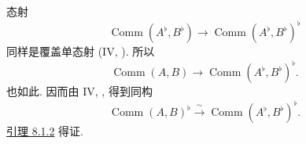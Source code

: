 态射
\[
  \operatorname{Comm}(A^\flat,B^\flat)
    \longrightarrow
  \operatorname{Comm}(A^\flat,B^\flat)^\flat
\]
同样是覆盖单态射
(IV, \textup{}).
所以
\[
  \operatorname{Comm}(A,B)
    \longrightarrow
  \operatorname{Comm}(A^\flat,B^\flat)^\flat.
\]
也如此. 因而由 IV, , 得到同构
\[
  \operatorname{Comm}(A,B)^\flat
    \xrightarrow{\ \sim\ }
  \operatorname{Comm}(A^\flat,B^\flat)^\flat.
\]
\hyperref[lem:sga3-VIB-8.1.2]{引理 8.1.2} 得证.

